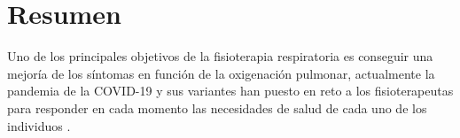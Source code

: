 \documentclass[12pt]{article}
\begin{document}


%

%

%









\clearpage\null\newpage


\section*{Resumen}

Uno de los principales objetivos de la fisioterapia respiratoria es conseguir una mejoría de los síntomas en función de la oxigenación pulmonar, actualmente la pandemia de la COVID-19 y sus variantes han puesto en reto a los fisioterapeutas para responder en cada momento las necesidades de salud de cada uno de los individuos \cite{28}. 
\end{document}
